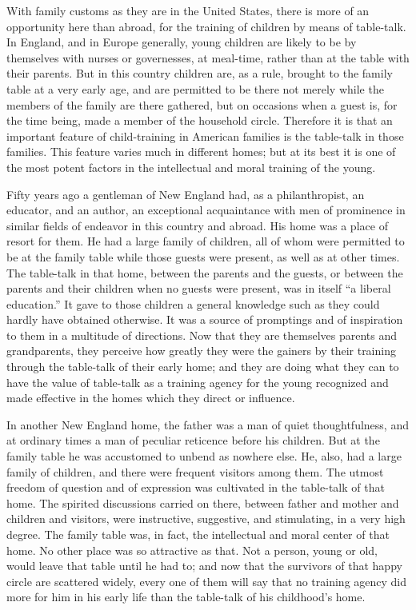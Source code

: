\documentclass[
]{book}
\begin{document}
With family customs as they are in the United States, there is more of an opportunity here than abroad, for the training of children by means of table-talk. In England, and in Europe generally, young children are likely to be by themselves with nurses or governesses, at meal-time, rather than at the table with their parents. But in this country children are, as a rule, brought to the family table at a very early age, and are permitted to be there not merely while the members of the family are there gathered, but on occasions when a guest is, for the time being, made a member of the household circle. Therefore it is that an important feature of child-training in American families is the table-talk in those families. This feature varies much in different homes; but at its best it is one of the most potent factors in the intellectual and moral training of the young.

Fifty years ago a gentleman of New England had, as a philanthropist, an educator, and an author, an exceptional acquaintance with men of prominence in similar fields of endeavor in this country and abroad. His home was a place of resort for them. He had a large family of children, all of whom were permitted to be at the family table while those guests were present, as well as at other times. The table-talk in that home, between the parents and the guests, or between the parents and their children when no guests were present, was in itself ``a liberal education.'' It gave to those children a general knowledge such as they could hardly have obtained otherwise. It was a source of promptings and of inspiration to them in a multitude of directions. Now that they are themselves parents and grandparents, they perceive how greatly they were the gainers by their training through the table-talk of their early home; and they are doing what they can to have the value of table-talk as a training agency for the young recognized and made effective in the homes which they direct or influence.

In another New England home, the father was a man of quiet thoughtfulness, and at ordinary times a man of peculiar reticence before his children. But at the family table he was accustomed to unbend as nowhere else. He, also, had a large family of children, and there were frequent visitors among them. The utmost freedom of question and of expression was cultivated in the table-talk of that home. The spirited discussions carried on there, between father and mother and children and visitors, were instructive, suggestive, and stimulating, in a very high degree. The family table was, in fact, the intellectual and moral center of that home. No other place was so attractive as that. Not a person, young or old, would leave that table until he had to; and now that the survivors of that happy circle are scattered widely, every one of them will say that no training agency did more for him in his early life than the table-talk of his childhood's home.
\end{document}
